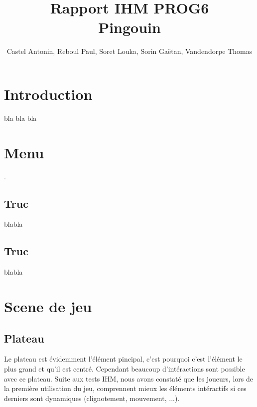 \documentclass{report}
\title{\textbf{Rapport IHM PROG6}\\Pingouin}
\author{Castel Antonin, Reboul Paul, Soret Louka, Sorin Gaëtan, Vandendorpe Thomas}
\begin{document}
\maketitle{}
\tableofcontents
\chapter{Introduction}
bla bla bla
\chapter{Menu}.
\section{Truc}
blabla

\section{Truc}
blabla


\chapter{Scene de jeu}
\section{Plateau}
Le plateau est évidemment l'élément pincipal, c'est pourquoi c'est l'élément le plus grand et qu'il est centré. Cependant beaucoup d'intéractions sont possible avec ce plateau. Suite aux tests IHM,
nous avons constaté que les joueurs, lors de la première utilisation du jeu, comprennent mieux les éléments intéractifs si ces derniers sont dynamiques (clignotement, mouvement, ...).
\end{document}
